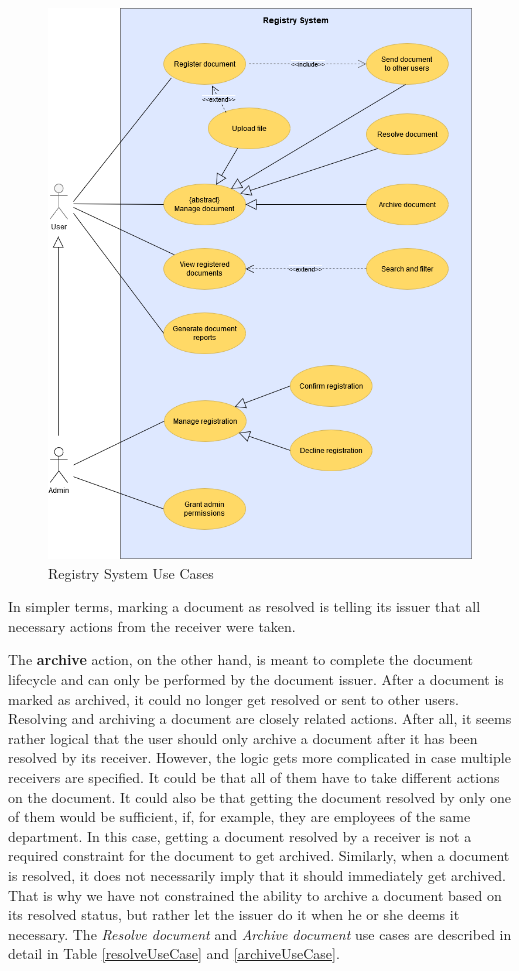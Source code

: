 \begin{figure}[H]
    \centering
    \includegraphics[width=5in]{images/useCase}
    \caption{Registry System Use Cases}
    \label{useCase}
\end{figure}

In simpler terms, marking a document as resolved is telling its issuer that all necessary actions from the receiver were taken.

The \textbf{archive} action, on the other hand, is meant to complete the document lifecycle and can only be performed by the document issuer. After a document is marked as archived, it could no longer get resolved or sent to other users. Resolving and archiving a document are closely related actions. After all, it seems rather logical that the user should only archive a document after it has been resolved by its receiver. However, the logic gets more complicated in case multiple receivers are specified. It could be that all of them have to take different actions on the document. It could also be that getting the document resolved by only one of them would be sufficient, if, for example, they are employees of the same department. In this case, getting a document resolved by a receiver is not a required constraint for the document to get archived. Similarly, when a document is resolved, it does not necessarily imply that it should immediately get archived. That is why we have not constrained the ability to archive a document based on its resolved status, but rather let the issuer do it when he or she deems it necessary. The \textit{Resolve document} and \textit{Archive document} use cases are described in detail in Table \ref{resolveUseCase} and \ref{archiveUseCase}.

